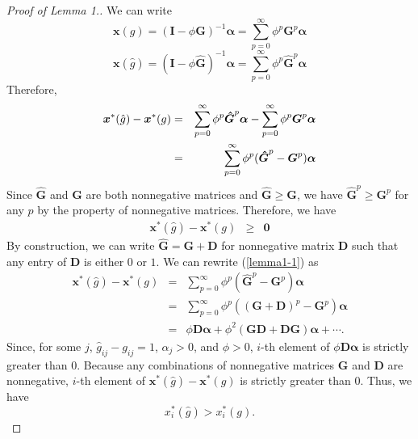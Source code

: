 \documentclass[12pt]{article}
\theoremstyle{definition}
\newcommand{\bm}[1]{\boldsymbol{#1}}
\begin{document}
\begin{proof}[Proof of Lemma 1.]
	We can write
	\[ \bm{x}(g) = {(\bm{I} - \phi \bm{G})}^{-1} \bm{\alpha} = \sum_{p=0}^{\infty} \phi^p \bm{G}^p \bm{\alpha} \]
	\[ \bm{x}(\hat{g}) = {(\bm{I} - \phi \bm{\hat{G}})}^{-1} \bm{\alpha} = \sum_{p=0}^{\infty} \phi^p \bm{\hat{G}}^p \bm{\alpha} \]
	Therefore,
	\begin{eqnarray}
		\label{lemma1-1}
		\bm{x}^*(\hat{g}) - \bm{x}^*(g) &=& \sum_{p=0}^{\infty} \phi^p \bm{\hat{G}}^p \bm{\alpha} - \sum_{p=0}^{\infty} \phi^p \bm{G}^p \bm{\alpha} \notag \\
										&=& \sum_{p=0}^{\infty} \phi^p (\bm{\hat{G}}^p - \bm{G}^p) \bm{\alpha} \notag 
	\end{eqnarray}
	Since $\bm{\hat{G}}$ and $\bm{G}$ are both nonnegative matrices and $\bm{\hat{G}} \ge \bm{G}$, we have $\bm{\hat{G}}^p \ge \bm{G}^p$ for any $p$ by the property of nonnegative matrices.
	Therefore, we have
	\begin{eqnarray*}
		\bm{x}^*(\hat{g}) - \bm{x}^*(g) &\ge& \bm{0}
	\end{eqnarray*}
	By construction, we can write $\bm{\hat{G}} = \bm{G} + \bm{D}$ for nonnegative matrix $\bm{D}$ such that any entry of $\bm{D}$ is either $0$ or $1$.
	We can rewrite (\ref{lemma1-1}) as
	\begin{eqnarray*}
		\bm{x}^*(\hat{g}) - \bm{x}^*(g) &=& \sum_{p=0}^{\infty} \phi^p (\bm{\hat{G}}^p - \bm{G}^p) \bm{\alpha} \\
										&=& \sum_{p=0}^{\infty} \phi^p ((\bm{G} + \bm{D})^p - \bm{G}^p) \bm{\alpha} \\
										&=& \phi \bm{D} \bm{\alpha} + \phi^2 (\bm{G} \bm{D} + \bm{D} \bm{G}) \bm{\alpha} + \cdots .
	\end{eqnarray*}
	Since, for some $j$, $\hat{g}_{ij} - g_{ij} = 1$, $\alpha_j > 0$, and $\phi > 0$, $i$-th element of $\phi \bm{D} \bm{\alpha}$ is strictly greater than $0$.
	Because any combinations of nonnegative matrices $\bm{G}$ and $\bm{D}$ are nonnegative, $i$-th element of $\bm{x}^*(\hat{g}) - \bm{x}^*(g)$ is strictly greater than $0$.
	Thus, we have
	\[ x_i^*(\hat{g}) > x_i^*(g). \]
\end{proof}
\end{document}
